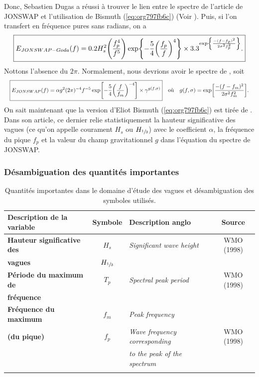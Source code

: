 \documentclass[10pt]{article}
\numberwithin{equation}{section}
\begin{document}
Donc, Sebastien Dugas a réussi à trouver le lien entre le spectre de l'article de JONSWAP et l'utilisation de Bismuth (\ref{eq:org797fb6c}) (Voir \Textcite{goda1988variablity}).
Puis, si l'on transfert en fréquence pures sans radians, on a
\begin{equation}
   \boxed{E_{JONSWAP-Goda}(f) = 0.2H_s^2 \qty(\frac{f_p^4}{f^5}) \exp{-\frac{5}{4}\qty(\frac{f_p}{f})^4} \times 3.3^{\exp{\frac{-(f-f_p)^2}{2\sigma^2 f_p^2}}}.}   
\end{equation}
Nottons l'absence du \(2\pi\).
Normalement, nous devrions avoir le spectre de \Textcite{hasselmann1973measurements}, soit
\begin{align}
   && \boxed{E_{JONSWAP}(f) = \alpha g^2 (2\pi)^{-4} f^{-5} \exp[- \frac{5}{4} \qty(\frac{f}{f_m})^{-4}]\times \gamma^{g(f,\sigma)}}
   && \text{où}
   && g(f,\sigma) = \exp[ \frac{-(f-f_m)^2}{2\sigma^2f_m^2}]. &&
\end{align}
On sait maintenant que la version d'Eliot Bismuth (\ref{eq:org797fb6c}) est tirée de \Textcite[, à l'équation 11 de l'article]{goda1988variablity}.
Dans son article, ce dernier relie statistiquement la hauteur significative des vagues (ce qu'on appelle courament \(H_s\) ou \(H_{\sfrac{1}{3}}\)) avec le coefficient \(\alpha\), la fréquence du pique \(f_p\) et la valeur du champ gravitationnel \(g\) dans l'équation du spectre de JONSWAP.
\subsubsection{Désambiguation des quantités importantes}
\label{sec:org7579b80}

\begin{table}[htbp]
\caption{Quantités importantes dans le domaine d'étude des vagues et désambiguation des symboles utilisés.}
\centering
\begin{tabular}{lclc}
Description de la variable & Symbole & Description anglo & Source\\
\hline
\hline
\textbf{Hauteur significative des} & \(H_s\) & \emph{Significant wave height} & WMO (1998)\\
\textbf{vagues} & \(H_{\sfrac{1}{3}}\) &  & \Textcite{goda1988variablity}\\
\hline
\textbf{Période du maximum de} & \(T_p\) & \emph{Spectral peak period} & WMO (1998)\\
\textbf{fréquence} &  &  & \\
\hline
\textbf{Fréquence du maximum} & \(f_m\) & \emph{Peak frequency} & \Textcite{hasselmann1973measurements}\\
\textbf{(du pique)} & \(f_p\) & \emph{Wave frequency corresponding} & WMO (1998)\\
 &  & \emph{to the peak of the spectrum} & \\
\hline
 &  &  & \\
\end{tabular}
\end{table}
\end{document}
